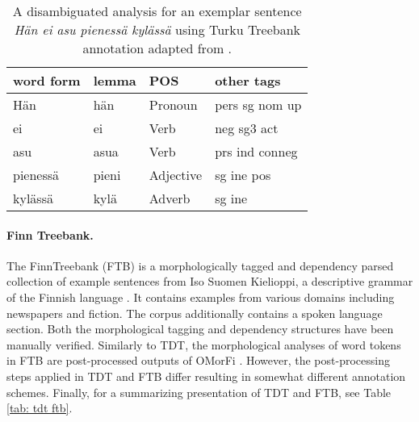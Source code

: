 \documentclass[smallextended]{svjour3}       %
\begin{document}
\begin{table}[h!]
\begin{center}
\begin{tabular}{llll} 
\hline
\noalign{\smallskip}
word form & lemma & POS & other tags \\
\hline
\noalign{\smallskip}
H\"an & h\"an & Pronoun & pers sg nom up\\
ei & ei & Verb & neg sg3 act \\
asu  & asua & Verb & prs ind conneg \\
pieness\"a   & pieni & Adjective & sg ine pos \\
kyl\"ass\"a  & kyl\"a & Adverb & sg ine \\
\end{tabular}
\end{center}
\caption{A disambiguated analysis for an exemplar sentence \emph{H\"an ei asu pieness\"a kyl\"ass\"a} using Turku Treebank annotation adapted from \citet{haverinen2013}.}
\label{tab: tdt omorfi} 
\end{table}


\paragraph{Finn Treebank.}

The FinnTreebank (FTB) \citep{voutilainen2011} is a morphologically tagged and dependency parsed collection of example sentences from Iso Suomen Kielioppi, a descriptive grammar of the Finnish language \citep{hakulinen2004}. It contains examples from various domains including newspapers and fiction. The corpus additionally contains a spoken language section. Both the morphological tagging and dependency structures have been manually verified.
Similarly to TDT, the morphological analyses of word tokens in FTB are post-processed outputs of OMorFi \citep{pirinen2008}. However, the post-processing steps applied in TDT and FTB differ resulting in somewhat different annotation schemes. %
Finally, for a summarizing presentation of TDT and FTB, see Table \ref{tab: tdt ftb}.
\end{document}
